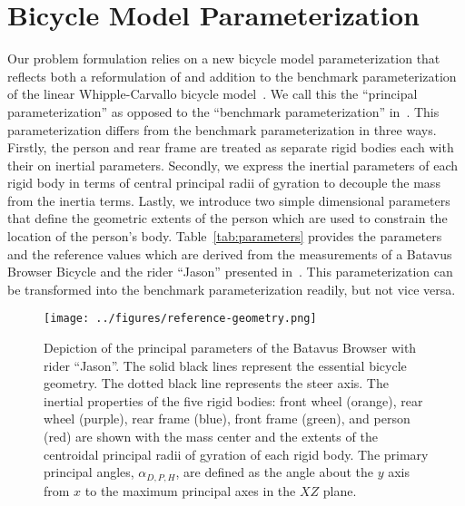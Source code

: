 \documentclass{bmd2019p}
\begin{document}
\section{Bicycle Model Parameterization}
%
Our problem formulation relies on a new bicycle model parameterization that
reflects both a reformulation of and addition to the benchmark parameterization
of the linear Whipple-Carvallo bicycle model~\cite{Meijaard2007}. We call this
the ``principal parameterization'' as opposed to the ``benchmark
parameterization'' in~\cite{Meijaard2007}. This parameterization differs from
the benchmark parameterization in three ways. Firstly, the person and rear
frame are treated as separate rigid bodies each with their on inertial
parameters. Secondly, we express the inertial parameters of each rigid body in
terms of central principal radii of gyration to decouple the mass from the
inertia terms.  Lastly, we introduce two simple dimensional parameters that
define the geometric extents of the person which are used to constrain the
location of the person's body. Table~\ref{tab:parameters} provides the
parameters and the reference values which are derived from the measurements of
a Batavus Browser Bicycle and the rider ``Jason'' presented
in~\cite{Moore2012}. This parameterization can be transformed into the
benchmark parameterization readily, but not vice versa.
%
\begin{figure}
  \centering
  \texttt{[image: ../figures/reference-geometry.png]}
  \caption{Depiction of the principal parameters of the Batavus Browser
    with rider ``Jason''. The solid black lines represent the essential bicycle
    geometry. The dotted black line represents the steer axis. The inertial
    properties of the five rigid bodies: front wheel (orange), rear wheel
    (purple), rear frame (blue), front frame (green), and person (red) are
    shown with the mass center and the extents of the centroidal principal
    radii of gyration of each rigid body. The primary principal angles,
    $\alpha_{D,P,H}$, are defined as the angle about the $y$ axis from $x$ to
    the maximum principal axes in the $XZ$ plane.}
\end{figure}
%
\end{document}
